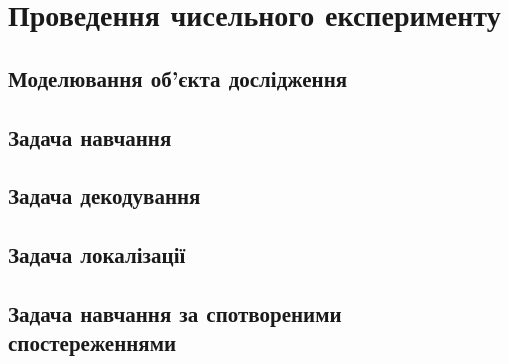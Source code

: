 
\chapter{Проведення чисельного експерименту}
\label{chap: practice}

\section{Моделювання об'єкта дослідження}

\section{Задача навчання}

\section{Задача декодування}

\section{Задача локалізації}

\section{Задача навчання за спотвореними спостереженнями}






